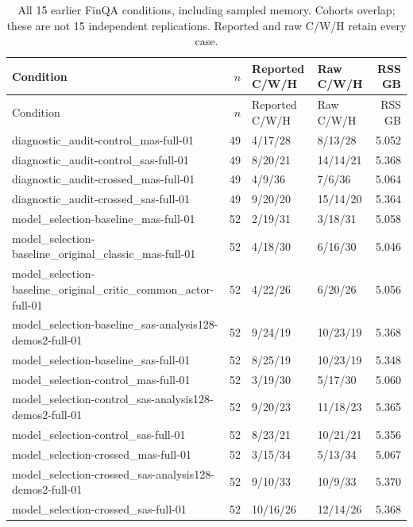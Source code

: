 {\small\setlength{\tabcolsep}{3pt}\begin{longtable}{p{}rllr}
\caption{All 15 earlier FinQA conditions, including sampled memory. Cohorts overlap; these are not 15 independent replications. Reported and raw C/W/H retain every case.}\label{tab:historical-conditions}\\
Condition & $n$ & Reported C/W/H & Raw C/W/H & RSS GB\\\toprule\endfirsthead
Condition & $n$ & Reported C/W/H & Raw C/W/H & RSS GB\\\toprule\endhead
diagnostic\_audit-control\_mas-full-01 & 49 & 4/17/28 & 8/13/28 & 5.052\\
diagnostic\_audit-control\_sas-full-01 & 49 & 8/20/21 & 14/14/21 & 5.368\\
diagnostic\_audit-crossed\_mas-full-01 & 49 & 4/9/36 & 7/6/36 & 5.064\\
diagnostic\_audit-crossed\_sas-full-01 & 49 & 9/20/20 & 15/14/20 & 5.364\\
model\_selection-baseline\_mas-full-01 & 52 & 2/19/31 & 3/18/31 & 5.058\\
model\_selection-baseline\_original\_classic\_mas-full-01 & 52 & 4/18/30 & 6/16/30 & 5.046\\
model\_selection-baseline\_original\_critic\_common\_actor-full-01 & 52 & 4/22/26 & 6/20/26 & 5.056\\
model\_selection-baseline\_sas-analysis128-demos2-full-01 & 52 & 9/24/19 & 10/23/19 & 5.368\\
model\_selection-baseline\_sas-full-01 & 52 & 8/25/19 & 10/23/19 & 5.348\\
model\_selection-control\_mas-full-01 & 52 & 3/19/30 & 5/17/30 & 5.060\\
model\_selection-control\_sas-analysis128-demos2-full-01 & 52 & 9/20/23 & 11/18/23 & 5.365\\
model\_selection-control\_sas-full-01 & 52 & 8/23/21 & 10/21/21 & 5.356\\
model\_selection-crossed\_mas-full-01 & 52 & 3/15/34 & 5/13/34 & 5.067\\
model\_selection-crossed\_sas-analysis128-demos2-full-01 & 52 & 9/10/33 & 10/9/33 & 5.370\\
model\_selection-crossed\_sas-full-01 & 52 & 10/16/26 & 12/14/26 & 5.368\\
\bottomrule\end{longtable}}